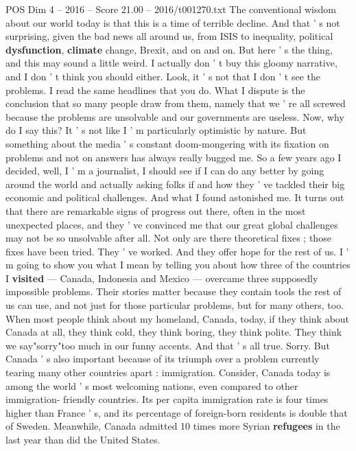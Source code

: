 \begin{textsample}{POS Dim 4 – 2016 – Score 21.00 – 2016/t001270.txt}  \label{ex:f4_pos_040}
The conventional wisdom about our world today is that this is a time of terrible decline.
And that ' s not surprising, given the bad news all around us, from ISIS to inequality, political \textbf{dysfunction}, \textbf{climate} change, Brexit, and on and on.
But here ' s the thing, and this may sound a little weird.
I actually don ' t buy this gloomy narrative, and I don ' t think you should either.
Look, it ' s not that I don ' t see the problems.
I read the same headlines that you do.
What I dispute is the conclusion that so many people draw from them, namely that we ' re all screwed because the problems are unsolvable and our governments are useless.
Now, why do I say this?
It ' s not like I ' m particularly optimistic by nature.
But something about the media ' s constant doom-mongering with its fixation on problems and not on answers has always really bugged me.
So a few years ago I decided, well, I ' m a journalist, I should see if I can do any better by going around the world and actually asking folks if and how they ' ve tackled their big economic and political challenges.
And what I found astonished me.
It turns out that there are remarkable signs of progress out there, often in the most unexpected places, and they ' ve convinced me that our great global challenges may not be so unsolvable after all.
Not only are there theoretical fixes ; those fixes have been tried.
They ' ve worked.
And they offer hope for the rest of us.
I ' m going to show you what I mean by telling you about how three of the countries I \textbf{visited} — Canada, Indonesia and Mexico — overcame three supposedly impossible problems.
Their stories matter because they contain tools the rest of us can use, and not just for those particular problems, but for many others, too.
When most people think about my homeland, Canada, today, if they think about Canada at all, they think cold, they think boring, they think polite.
They think we say"sorry"too much in our funny accents.
And that ' s all true.
Sorry.
But Canada ' s also important because of its triumph over a problem currently tearing many other countries apart : immigration.
Consider, Canada today is among the world ' s most welcoming nations, even compared to other immigration- friendly countries.
Its per capita immigration rate is four times higher than France ' s, and its percentage of foreign-born residents is double that of Sweden.
Meanwhile, Canada admitted 10 times more Syrian \textbf{refugees} in the last year than did the United States.

\end{textsample}
